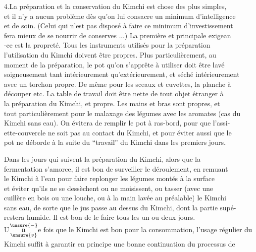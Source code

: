 4.\quad La préparation et la conservation du Kimchi est chose des plus simples,\\
et il n'y a aucun problème dès qu'on lui consacre un minimum d'intelligence\\
et de soin. (Celui qui n'est pas disposé à faire ce minimum d'investissement\\
fera mieux de se nourrir de conserves ...) La première et principale exigean\\
-ce est la propreté. Tous les instruments utilisés pour la préparation \\
l'utilisation du Kimchi doivent être propres. Plus particulièrement, au\\
moment de la préparation, le pot qu'on s'apprête à utiliser doit être lavé\\
soigneusement tant intérieurement qu'extérieurement, et séché intérieurement\\
avec un torchon propre. De même pour les sceaux et cuvettes, la planche à\\
découper etc. La table de travail doit être nette de tout objet étranger à\\
la préparation du Kimchi, et propre. Les mains et bras sont propres, et\\
tout particulièrement pour le malaxage des légumes avec les aromates (cas du\\
Kimchi sans eau). On évitera de remplir le pot à ras-bord, pour que l'assi-\\
ette-couvercle ne soit pas au contact du Kimchi, et pour éviter aussi que le\\
pot ne déborde à la suite du ``travail'' du Kimchi dans les premiers jours.

Dans les jours qui suivent la préparation du Kimchi, alors que la\\
fermentation s'amorce, il est bon de surveiller le déroulement, en remuant\\
le Kimchi à l'eau pour faire replonger les légumes montés à la surface\\
et éviter qu'ils ne se dessèchent ou ne moisissent, ou tasser (avec une\\
cuillère en bois ou une louche, ou à la main lavée au préalable) le Kimchi\\
sans eau, de sorte que le jus passe au dessus du Kimchi, dont la partie supé-\\
 restera humide. Il est bon de le faire tous les un ou deux jours.\\
U$\underset{\unsure{v}}{\overset{\unsure{-}}{\mathrm n}}$e fois que le Kimchi est bon pour la consommation, l'usage régulier du\\
Kimchi suffit à garantir en principe une bonne continuation du processus de
